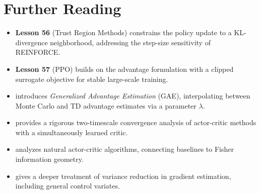 \documentclass[11pt,a4paper]{article}
\begin{document}
\section{Further Reading}

\begin{itemize}
  \item \textbf{Lesson 56} (Trust Region Methods) constrains the policy
    update to a KL-divergence neighborhood, addressing the step-size
    sensitivity of REINFORCE.

  \item \textbf{Lesson 57} (PPO) builds on the advantage formulation with
    a clipped surrogate objective for stable large-scale training.

  \item \citet{schulman2015} introduces \emph{Generalized Advantage
    Estimation} (GAE), interpolating between Monte Carlo and TD advantage
    estimates via a parameter $\lambda$.

  \item \citet{konda2003} provides a rigorous two-timescale convergence
    analysis of actor-critic methods with a simultaneously learned critic.

  \item \citet{bhatnagar2009} analyzes natural actor-critic algorithms,
    connecting baselines to Fisher information geometry.

  \item \citet[Chapter 6]{bertsekas1996} gives a deeper treatment of
    variance reduction in gradient estimation, including general control
    variates.
\end{itemize}


\end{document}
